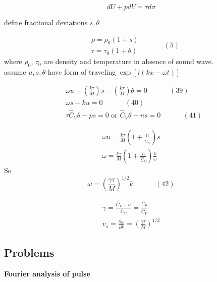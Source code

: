 \begin{equation}
dU + p dV = \tau d\sigma
\end{equation}

define fractional deviations $s,\theta$

\begin{equation}
  \begin{aligned}
    & \rho = \rho_0(1+s) \\
    & \tau = \tau_0 (1 + \theta) 
\end{aligned} \quad \quad \quad \, (5)
\end{equation}
where $\rho_0$, $\tau_0$ are density and temperature in absence of sound wave. \\
assume $u,s,\theta$ have form of traveling $\exp{ [ i (kx - \omega t)]}$

\begin{align}
& \omega u - \left( \frac{k \tau}{M} \right) s - \left( \frac{ k \tau }{M} \right) \theta =0  \quad \quad \quad \, (39) \\ 
& \omega s - ku =0 \quad \quad \quad \, (40) \\ 
& \tau \widehat{C}_V \theta - ps = 0 \text{ or } \widehat{C}_V \theta - ns = 0 \quad \quad \quad \, (41)
\end{align}

\[
\begin{gathered}
  \omega u = \frac{k\tau}{ M} \left( 1 + \frac{n}{ \widehat{C}_V} \right) s \\ 
  \omega = \frac{k\tau}{M} \left( 1 + \frac{n}{ \widehat{C}_V} \right) \frac{k}{\omega}
\end{gathered}
\]
So 
\begin{equation}
  \omega = \left( \frac{ \gamma \tau}{M} \right)^{1/2} k  \quad \quad \quad \, (42)
\end{equation}

\[
\begin{gathered}
  \gamma = \frac{ \widehat{C}_V + n }{ \widehat{C}_V } = \frac{\widehat{C}_p}{ \widehat{C}_V } \\ 
 v_s = \frac{ \partial \omega}{ \partial k} = \left( \frac{\gamma \tau}{ M} \right)^{1/2}
\end{gathered}
\]

\subsection*{Problems}

 \textbf{Fourier analysis of pulse}

